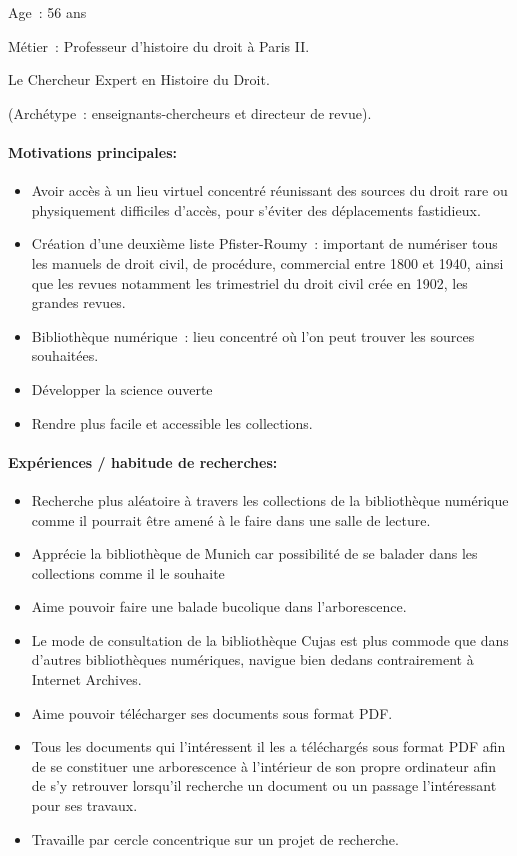 Age : 56 ans

Métier : Professeur d’histoire du droit à Paris II.

Le Chercheur Expert en Histoire du Droit.

(Archétype : enseignants-chercheurs et directeur de revue).

\paragraph*{Motivations principales:}

\begin{itemize}
	\item Avoir accès à un lieu virtuel concentré réunissant des sources du droit rare ou physiquement difficiles d’accès, pour s’éviter des déplacements fastidieux.
\item Création d’une deuxième liste Pfister-Roumy : important de numériser tous les manuels de droit civil, de procédure, commercial entre 1800 et 1940, ainsi que les revues notamment les trimestriel du droit civil crée en 1902, les grandes revues.
\item Bibliothèque numérique : lieu concentré où l’on peut trouver les sources souhaitées.
\item Développer la science ouverte
\item Rendre plus facile et accessible les collections.
\end{itemize} 

\paragraph*{Expériences / habitude de recherches:} 
\begin{itemize}
	\item Recherche plus aléatoire à travers les collections de la bibliothèque numérique comme il pourrait être amené à le faire dans une salle de lecture.
\item Apprécie la bibliothèque de Munich car possibilité de se balader dans les collections comme il le souhaite
\item Aime pouvoir faire une balade bucolique dans l’arborescence.
\item Le mode de consultation de la bibliothèque Cujas est plus commode que dans d’autres bibliothèques numériques, navigue bien dedans contrairement à Internet Archives.
\item Aime pouvoir télécharger ses documents sous format PDF.
\item Tous les documents qui l’intéressent il les a téléchargés sous format PDF afin de se constituer une arborescence à l’intérieur de son propre ordinateur afin de s’y retrouver lorsqu’il recherche un document ou un passage l’intéressant pour ses travaux.
\item Travaille par cercle concentrique sur un projet de recherche.
\end{itemize}

